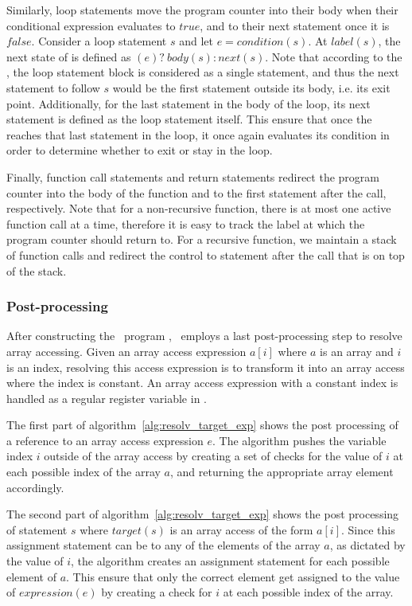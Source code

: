 Similarly, loop statements move the program counter
into their body when their conditional expression evaluates
to $true$, and to their next statement once it is $false$.
Consider a loop statement $s$ and let $e = condition(s)$.
At $label(s)$, the next state of  is defined
as $(e)?~ body(s):next(s)$. Note that according to the 
\psqlanguage, the loop statement block is considered 
as a single statement, and thus the next statement 
to follow $s$ would be the first statement outside its 
body, i.e. its exit point. Additionally, for the last
statement in the body of the loop, its next statement
is defined as the loop statement itself. This ensure that
once the  reaches that last statement in the 
loop, it once again evaluates its condition in order to
determine whether to exit or stay in the loop.  

Finally, function call statements and return statements 
redirect the program counter into the body of the function 
and to the first statement after the call, respectively. 
Note that for a non-recursive function, there is at most
one active function call at a time, therefore it is easy
to track the label at which the program counter 
should return to.
For a recursive function, we maintain a stack of function calls and redirect the control to statement after the 
call that is on top of the stack. 

\subsubsection*{Post-processing}
After constructing the \thislanguage~program \aigcircuit,
\mytool~employs a last post-processing step to resolve 
array accessing. Given an array access expression 
$a[i]$ where $a$ is an array and $i$ is an index, resolving
this access expression is to transform it into an array
access where the index is constant. An array access 
expression with a constant index is handled as a regular 
register variable in \aigcircuit. 

The first part of algorithm~\ref{alg:resolv_target_exp} 
shows the post
processing of a reference to an array access expression 
$e$. The algorithm pushes the variable index $i$ outside
of the array access by creating a set of checks for the 
value of $i$ at each possible index of the array $a$, and
returning the appropriate array element accordingly.

The second part of algorithm~\ref{alg:resolv_target_exp} 
shows the 
post processing of statement $s$ where $target(s)$
is an array access of the form $a[i]$. Since this 
assignment statement can be to any of the elements of the 
array $a$, as dictated by the value of $i$, the algorithm
creates an assignment statement for each possible 
element of $a$. This ensure that only the correct element
get assigned to the value of $expression(e)$ by creating
a check for $i$ at each possible index of the array.  

